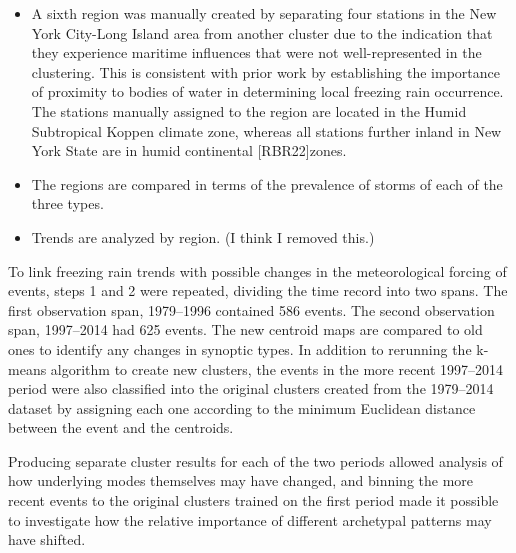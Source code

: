 \documentclass[twocol]{ametsoc}
\begin{document}
\begin{enumerate}
\begin{itemize}

\item

A sixth region was manually created by separating four stations in the New York City-Long Island area from another cluster due to the indication that they experience maritime influences that were not well-represented in the clustering. This is consistent with prior work by \citet{bernstein2000regional} establishing the importance of proximity to bodies of water in determining local freezing rain occurrence. The stations manually assigned to the region are located in the Humid Subtropical Koppen climate zone, whereas all stations further inland in New York State are in humid continental [RBR22]zones.

\item

The regions are compared in terms of the prevalence of storms of each of the three types.

\item

Trends are analyzed by region. (I think I removed this.)

\end{itemize}

\end{enumerate}



To link freezing rain trends with possible changes in the meteorological forcing of events, steps 1 and 2 were repeated, dividing the time record into two spans.   The first observation span, 1979--1996 contained 586 events.   The second observation span, 1997--2014 had 625 events.  The new centroid maps are compared to old ones to identify any changes in synoptic types. In addition to rerunning the k-means algorithm to create new clusters, the events in the more recent 1997--2014 period were also classified into the original clusters created from the 1979--2014 dataset by assigning each one according to the minimum Euclidean distance between the event and the centroids. 



Producing separate cluster results for each of the two periods allowed analysis of how underlying modes themselves may have changed, and binning the more recent events to the original clusters trained on the first period made it possible to investigate how the relative importance of different archetypal patterns may have shifted.
\end{document}
